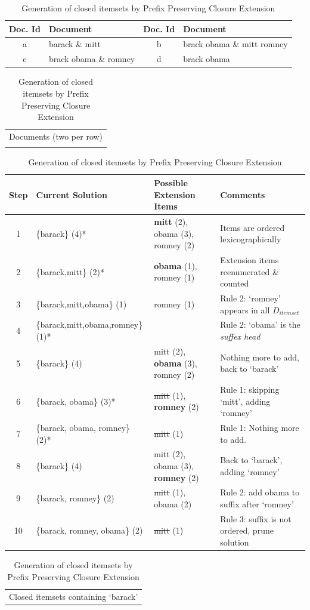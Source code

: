 \documentclass{sig-alternate}
\begin{document}
\begin{table}
\centering
\begin{tabular}{|c|p{5cm}||c|p{5cm}|} \hline
Doc. Id & Document & Doc. Id & Document\\\hline
a& barack \& mitt & b & brack obama \& mitt romney  \\\hline
c& brack obama \& romney & d & brack obama  \\\hline
\end{tabular}
\begin{tabular}{c}
Documents (two per row)\\\\
\end{tabular}
\begin{tabular}{|c|p{4.5cm}|p{5cm}|p{6cm}|} \hline
Step&Current Solution&Possible Extension Items&Comments\\ \hline
1& \{barack\} (4)* & \textbf{mitt} (2), obama (3), romney (2) & Items are ordered lexicographically\\ \hline
2& \{barack,mitt\} (2)* & \textbf{obama} (1), romney (1) & Extension items reenumerated \& counted\\ \hline
3 & \{barack,mitt,obama\} (1) & romney (1)                       & Rule 2: `romney' appears in all $D_{itemset}$\\\hline
4 & \{barack,mitt,obama,romney\}(1)* & & Rule 2: `obama'  is the \emph{suffex head} \\\hline
5 & \{barack\} (4) & mitt (2), \textbf{obama} (3), romney (2) & Nothing more to add, back to `barack' \\\hline
6 & \{barack, obama\} (3)* & \sout{mitt} (1), \textbf{romney} (2) & Rule 1: skipping `mitt', adding `romney' \\\hline
7 & \{barack, obama, romney\} (2)* & \sout{mitt} (1) & Rule 1: Nothing more to add. \\\hline
8 & \{barack\} (4) & mitt (2), obama (3), \textbf{romney} (2) & Back to `barack', adding `romney' \\\hline
9 & \{barack, romney\} (2) &  \sout{mitt} (1), obama (2) & Rule 2: add obama to suffix after `romney' \\\hline
10 & \{barack, romney, obama\} (2) &  \sout{mitt} (1)  & Rule 3: suffix is not ordered, prune solution\\\hline

\end{tabular}
\begin{tabular}{c}
Closed itemsets containing `barack'
\end{tabular}
\caption{Generation of closed itemsets by Prefix Preserving Closure Extension}
\label{table:PPCExample}
\end{table}
\end{document}
